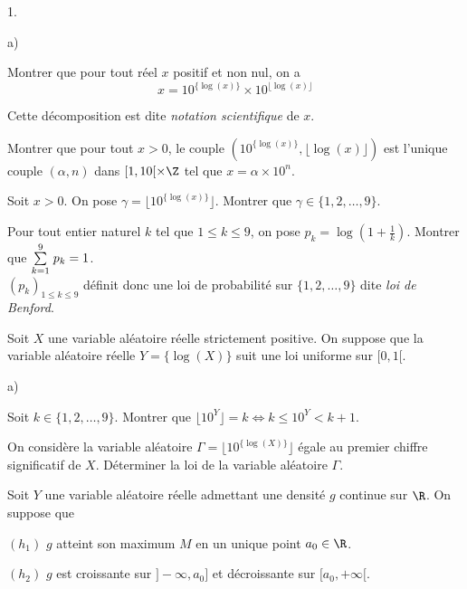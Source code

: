\documentclass[11pt]{article}%
\begin{document}
\begin{noliste}{1.}
\setlength{\itemsep}{2mm}

\item
\begin{noliste}{a)}
\item Montrer que pour tout réel $x$ positif et non nul, on a  
\[
x=10^{\{\log (x)\}} \times 10^{\lfloor\log (x)\rfloor}
\]

Cette décomposition est dite {\em notation scientifique} de $x$.
\item Montrer que pour tout $x>0$, le couple  $( 10^{\{\log (x)\}}, 
\lfloor\log (x)\rfloor )$ est l'unique couple $(\alpha , n)$ dans  
$[1,10[\times \Z$ tel que $x=\alpha \times 10^n$.

\item Soit $x>0$. On pose $\gamma=\lfloor 10^{\{ \log (x)\} }\rfloor$. 
Montrer que $\gamma\in\{ 1,2,\ldots , 9\}$.  
\end{noliste}

\item Pour tout entier naturel $k$ tel que $1\leq k\leq 9$, on pose 
$p_k=\log (1+\frac 1k)$. Montrer que 
${\textstyle\sum\limits_{k=1}^{9}}\hspace{.1cm} p_k=1$.\\
$(p_k)_{1\leq k\leq 9}$ définit donc une loi de probabilité sur $\{ 
1,2,\ldots , 9\}$ dite \emph{loi de Benford}.

\item Soit $X$ une variable aléatoire réelle strictement positive. 
On suppose que la variable aléatoire réelle $Y=\{\log (X)\}$ suit une 
loi uniforme sur $[0,1[$. 

\begin{noliste}{a)}
\item Soit $k\in\{ 1,2,\ldots , 9\}$. Montrer que $\lfloor 
10^Y\rfloor=k\Leftrightarrow k\leq 10^Y<k+1$.

\item On considère la variable aléatoire $\Gamma =\lfloor 
10^{\{\log (X)\}}\rfloor$ égale au premier chiffre significatif de $X$. 
Déterminer la loi de la variable aléatoire $\Gamma$.  
\end{noliste}

\item 
Soit $Y$ une variable aléatoire réelle admettant une densité $g$ 
continue sur $\R$. On suppose que 
\begin{nonoliste}{}
\item $(h_1)$ \quad $g$ atteint son maximum $M$ en un unique point 
$a_0\in\R$.

\item $(h_2)$ \quad $g$ est croissante sur $]-\infty , a_0]$ et 
décroissante sur $[a_0,+\infty [$.
\end{nonoliste}


\end{noliste}
\end{document}
